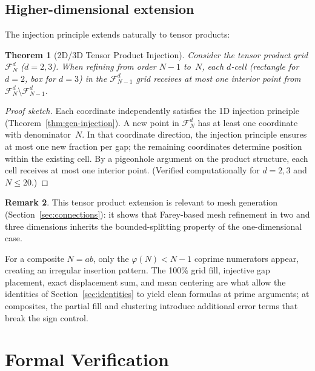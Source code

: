 \documentclass[11pt]{article}
\newtheorem{theorem}{Theorem}[section]
\theoremstyle{definition}
\newtheorem{remark}[theorem]{Remark}
\newcommand{\F}{\mathcal{F}}
\begin{document}
\subsection{Higher-dimensional extension}

The injection principle extends naturally to tensor products:

\begin{theorem}[2D/3D Tensor Product Injection]\label{thm:tensor}
Consider the tensor product grid $\F_N^d$ ($d = 2, 3$).
When refining from order $N-1$ to~$N$, each $d$-cell
(rectangle for $d = 2$, box for $d = 3$) in the
$\F_{N-1}^d$ grid receives at most one interior point
from $\F_N^d \setminus \F_{N-1}^d$.
\end{theorem}

\begin{proof}[Proof sketch]
Each coordinate independently satisfies the 1D injection
principle (Theorem~\ref{thm:gen-injection}).  A new point
in $\F_N^d$ has at least one coordinate with denominator~$N$.
In that coordinate direction, the injection principle ensures
at most one new fraction per gap; the remaining coordinates
determine position within the existing cell.  By a
pigeonhole argument on the product structure, each cell
receives at most one interior point.
(Verified computationally for $d = 2, 3$ and $N \le 20$.)
\end{proof}

\begin{remark}
This tensor product extension is relevant to mesh generation
(Section~\ref{sec:connections}): it shows that Farey-based
mesh refinement in two and three dimensions inherits the
bounded-splitting property of the one-dimensional case.
\end{remark}

For a composite $N = ab$, only the $\varphi(N) < N - 1$ coprime
numerators appear, creating an irregular insertion pattern.
The 100\% grid fill, injective gap placement, exact displacement
sum, and mean centering are what allow the identities of
Section~\ref{sec:identities} to yield clean formulas at prime
arguments; at composites, the partial fill and clustering introduce
additional error terms that break the sign control.


\section{Formal Verification}\label{sec:formal}
\end{document}
